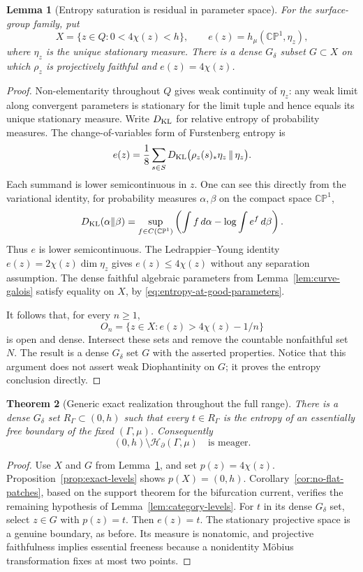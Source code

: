 \documentclass[11pt,letterpaper]{amsart}
\newtheorem{theorem}{Theorem}[section]
\newtheorem{lemma}[theorem]{Lemma}
\theoremstyle{definition}
\theoremstyle{remark}
\numberwithin{equation}{section}
\newcommand{\CP}{\mathbb{CP}}
\newcommand{\HH}{\mathscr H_{\partial}}
\begin{document}
\begin{lemma}[Entropy saturation is residual in parameter space]
\label{lem:residual-saturation}
For the surface-group family, put
\[
 X=\{z\in Q:0<4\chi(z)<h\},\qquad
 e(z)=h_\mu(\CP^1,\eta_z),
\]
where $\eta_z$ is the unique stationary measure. There is a dense
$G_\delta$ subset $G\subset X$ on which $\rho_z$ is projectively
faithful and $e(z)=4\chi(z)$.
\end{lemma}
\begin{proof}
Non-elementarity throughout $Q$ gives weak continuity of $\eta_z$:
any weak limit along convergent parameters is stationary for the
limit tuple and hence equals its unique stationary measure.
Write $D_{\rm KL}$ for relative entropy of probability measures.
The change-of-variables form of Furstenberg entropy is
\[
 e(z)=\frac18\sum_{s\in S}
 D_{\rm KL}\bigl(\rho_z(s)_*\eta_z\,\|\,\eta_z\bigr).
\]
Each summand is lower semicontinuous in $z$. One can see this directly
from the variational identity, for probability measures $\alpha,\beta$
on the compact space $\CP^1$,
\[
 D_{\rm KL}(\alpha\|\beta)
 =\sup_{f\in C(\CP^1)}
 \left(\int f\,d\alpha-\log\int e^f\,d\beta\right).
\]
Thus $e$ is lower semicontinuous. The Ledrappier--Young identity
$e(z)=2\chi(z)\dim\eta_z$ gives $e(z)\le4\chi(z)$ without
any separation assumption. The dense faithful algebraic parameters
from Lemma~\ref{lem:curve-galois} satisfy equality on $X$, by
\eqref{eq:entropy-at-good-parameters}.

It follows that, for every $n\ge1$,
\[
 O_n=\{z\in X:e(z)>4\chi(z)-1/n\}
\]
is open and dense. Intersect these sets and remove the countable
nonfaithful set $N$. The result is a dense $G_\delta$ set $G$ with
the asserted properties. Notice that this argument does not assert
weak Diophantinity on $G$; it proves the entropy conclusion directly.
\end{proof}

\begin{theorem}[Generic exact realization throughout the full range]
\label{thm:generic-realization}
There is a dense $G_\delta$ set $R_\Gamma\subset(0,h)$ such that every
$t\in R_\Gamma$ is the entropy of an essentially free boundary of the
fixed $(\Gamma,\mu)$. Consequently
\[
 (0,h)\setminus\HH(\Gamma,\mu)\quad\text{is meager}.
\]
\end{theorem}
\begin{proof}
Use $X$ and $G$ from Lemma~\ref{lem:residual-saturation}, and set
$p(z)=4\chi(z)$. Proposition~\ref{prop:exact-levels} shows $p(X)=(0,h)$.
Corollary~\ref{cor:no-flat-patches}, based on the support theorem for
the bifurcation current, verifies the remaining hypothesis of
Lemma~\ref{lem:category-levels}. For $t$ in its dense $G_\delta$
set, select $z\in G$ with $p(z)=t$. Then $e(z)=t$.
The stationary projective space is a genuine boundary, as before.
Its measure is nonatomic, and projective faithfulness implies
essential freeness because a nonidentity M\"obius transformation
fixes at most two points.
\end{proof}
\end{document}
